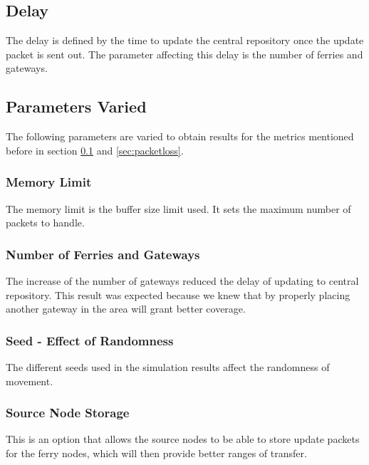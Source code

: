 \subsection{Delay}
\label{sec:delay}
The delay is defined by the time to update the central repository once the update packet is sent out.  
The parameter affecting this delay is the number of ferries and gateways.

\subsection{Parameters Varied} %
The following parameters are varied to obtain results for the metrics mentioned before in section \ref{sec:delay} and \ref{sec:packetloss}.
  
\subsubsection{Memory Limit}
The memory limit is the buffer size limit used.
It sets the maximum number of packets to handle.  

\subsubsection{Number of Ferries and Gateways}
The increase of the number of gateways reduced the delay of updating to central repository.  
This result was expected because we knew that by properly placing another gateway in the area will grant better coverage.  

\subsubsection{Seed - Effect of Randomness}
The different seeds used in the simulation results affect the randomness of movement.  

\subsubsection{Source Node Storage}
\label{sec:source_node_storage}
This is an option that allows the source nodes to be able to store update packets for the ferry nodes, which will then provide better ranges of transfer.
